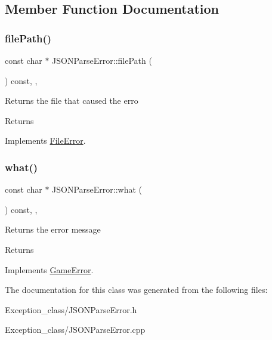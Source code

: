 \subsection{Member Function Documentation}
\mbox{\label{classJSONParseError_a24c5c1358b6ae6c96b30ebaa96e0a30b}} 
\subsubsection{\texorpdfstring{file\+Path()}{filePath()}}
{\footnotesize\ttfamily const char $\ast$ J\+S\+O\+N\+Parse\+Error\+::file\+Path (\begin{DoxyParamCaption}{ }\end{DoxyParamCaption}) const\hspace{0.3cm}{\ttfamily [override]}, {\ttfamily [virtual]}, {\ttfamily [noexcept]}}

Returns the file that caused the erro \begin{DoxyReturn}{Returns}

\end{DoxyReturn}


Implements \hyperlink{classFileError_a40918f5dda2ee7063bba81d286392cdd}{File\+Error}.

\mbox{\label{classJSONParseError_a1f33b495974db21a050ede28eb0fe298}} 
\subsubsection{\texorpdfstring{what()}{what()}}
{\footnotesize\ttfamily const char $\ast$ J\+S\+O\+N\+Parse\+Error\+::what (\begin{DoxyParamCaption}{ }\end{DoxyParamCaption}) const\hspace{0.3cm}{\ttfamily [override]}, {\ttfamily [virtual]}, {\ttfamily [noexcept]}}

Returns the error message \begin{DoxyReturn}{Returns}

\end{DoxyReturn}


Implements \hyperlink{classGameError_afbe93d6a2023f2824be2733aff9e86cb}{Game\+Error}.



The documentation for this class was generated from the following files\+:\begin{DoxyCompactItemize}
\item 
Exception\+\_\+class/J\+S\+O\+N\+Parse\+Error.\+h\item 
Exception\+\_\+class/J\+S\+O\+N\+Parse\+Error.\+cpp\end{DoxyCompactItemize}
